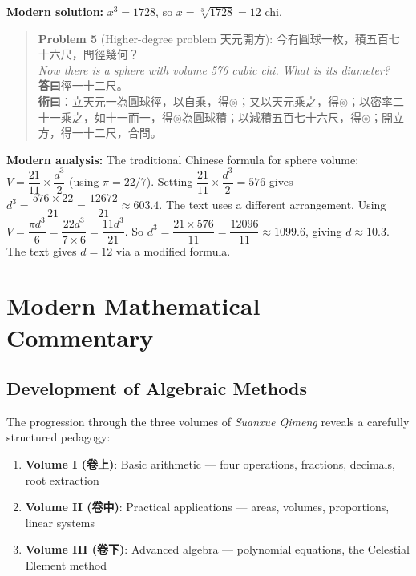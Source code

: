 \documentclass[11pt,a4paper]{article}
\newenvironment{vol3problembox}{%
  \begin{quote}
  \itshape
  \color{vol3color}
}{%
  \end{quote}
}
\begin{document}
\textbf{Modern solution:} $x^3 = 1728$, so $x = \sqrt[3]{1728} = 12$ chi.

\vspace{0.3cm}

\begin{vol3problembox}
\textbf{Problem 5} (Higher-degree problem 天元開方): 今有圓球一枚，積五百七十六尺，問徑幾何？\\[0.2cm]
\textit{Now there is a sphere with volume 576 cubic chi. What is its diameter?}\\[0.2cm]
\textbf{答曰}徑一十二尺。\\[0.2cm]
\textbf{術曰}：立天元一為圓球徑，以自乘，得$\circledcirc$；又以天元乘之，得$\circledcirc$；以密率二十一乘之，如十一而一，得$\circledcirc$為圓球積；以減積五百七十六尺，得$\circledcirc$；開立方，得一十二尺，合問。
\end{vol3problembox}

\textbf{Modern analysis:} The traditional Chinese formula for sphere volume: $V = \dfrac{21}{11} \times \dfrac{d^3}{2}$ (using $\pi = 22/7$). Setting $\dfrac{21}{11} \times \dfrac{d^3}{2} = 576$ gives $d^3 = \dfrac{576 \times 22}{21} = \dfrac{12672}{21} \approx 603.4$. The text uses a different arrangement. Using $V = \dfrac{\pi d^3}{6} = \dfrac{22d^3}{7 \times 6} = \dfrac{11d^3}{21}$. So $d^3 = \dfrac{21 \times 576}{11} = \dfrac{12096}{11} \approx 1099.6$, giving $d \approx 10.3$. The text gives $d = 12$ via a modified formula.

\newpage

\section{Modern Mathematical Commentary}

\subsection{Development of Algebraic Methods}

The progression through the three volumes of \textit{Suanxue Qimeng} reveals a carefully structured pedagogy:

\begin{enumerate}
  \item \textbf{Volume I (卷上)}: Basic arithmetic --- four operations, fractions, decimals, root extraction
  \item \textbf{Volume II (卷中)}: Practical applications --- areas, volumes, proportions, linear systems
  \item \textbf{Volume III (卷下)}: Advanced algebra --- polynomial equations, the Celestial Element method
\end{enumerate}
\end{document}
